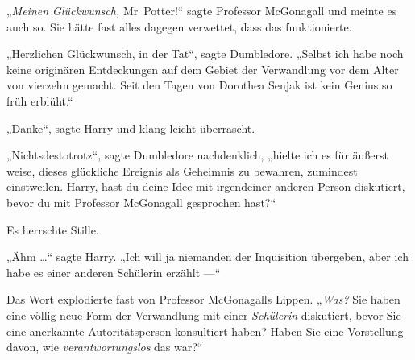 „\emph{Meinen Glückwunsch,} Mr~Potter!“ sagte Professor McGonagall und meinte es auch so. Sie hätte fast alles dagegen verwettet, dass das funktionierte.

„Herzlichen Glückwunsch, in der Tat“, sagte Dumbledore.
„Selbst ich habe noch keine originären Entdeckungen auf dem Gebiet der Verwandlung vor dem Alter von vierzehn gemacht. Seit den Tagen von Dorothea Senjak ist kein Genius so früh erblüht.“%

„Danke“, sagte Harry und klang leicht überrascht.

„Nichtsdestotrotz“, sagte Dumbledore nachdenklich, „hielte ich es für äußerst weise, dieses glückliche Ereignis als Geheimnis zu bewahren, zumindest einstweilen. Harry, hast du deine Idee mit irgendeiner anderen Person diskutiert, bevor du mit Professor McGonagall gesprochen hast?“

Es herrschte Stille.

„Ähm …“ sagte Harry.
„Ich will ja niemanden der Inquisition übergeben, aber ich habe es einer anderen Schülerin erzählt —“

Das Wort explodierte fast von Professor McGonagalls Lippen.
„\emph{Was?} Sie haben eine völlig neue Form der Verwandlung mit einer \emph{Schülerin} diskutiert, bevor Sie eine anerkannte Autoritätsperson konsultiert haben? Haben Sie eine Vorstellung davon, wie \emph{verantwortungslos} das war?“


